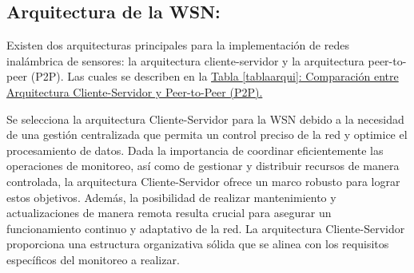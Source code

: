 \subsection{Arquitectura de la WSN:}
Existen dos arquitecturas principales para la implementación de redes inalámbrica de sensores: la arquitectura cliente-servidor y la arquitectura peer-to-peer (P2P). Las cuales se describen en la \hyperref[tablaarqui]{Tabla \ref{tablaarqui}: Comparación entre Arquitectura Cliente-Servidor y Peer-to-Peer (P2P).}


Se selecciona la arquitectura Cliente-Servidor para la WSN debido a la necesidad de una gestión centralizada que permita un control preciso de la red y optimice el procesamiento de datos. Dada la importancia de coordinar eficientemente las operaciones de monitoreo, así como de gestionar y distribuir recursos de manera controlada, la arquitectura Cliente-Servidor ofrece un marco robusto para lograr estos objetivos. Además, la posibilidad de realizar mantenimiento y actualizaciones de manera remota resulta crucial para asegurar un funcionamiento continuo y adaptativo de la red. La arquitectura Cliente-Servidor proporciona una estructura organizativa sólida que se alinea con los requisitos específicos del monitoreo a realizar.
\newpage
